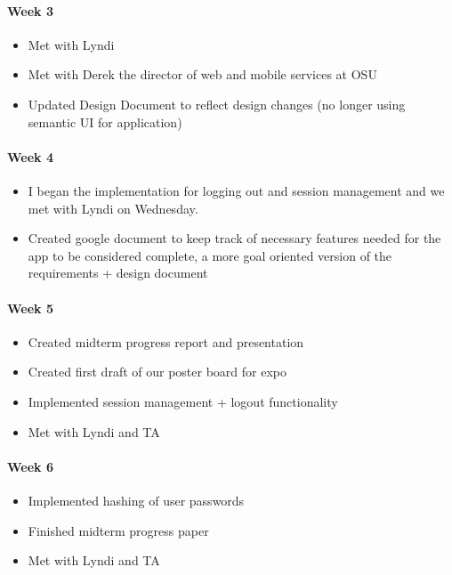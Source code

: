 \documentclass[onecolumn, draftclsnofoot,10pt, compsoc]{IEEEtran}
\begin{document}
      \paragraph{Week 3}
        \begin{itemize}
          \item Met with Lyndi
          \item Met with Derek the director of web and mobile services at OSU
          \item Updated Design Document to reflect design changes (no longer using semantic UI for application)
        \end{itemize}

      \paragraph{Week 4}
        \begin{itemize}
          \item I began the implementation for logging out and session management and we met with Lyndi on Wednesday.
          \item Created google document to keep track of necessary features needed for the app to be considered complete, a more goal oriented version of the requirements + design document
        \end{itemize}

      \paragraph{Week 5}
        \begin{itemize}
          \item Created midterm progress report and presentation
          \item Created first draft of our poster board for expo
          \item Implemented session management + logout functionality
          \item Met with Lyndi and TA
        \end{itemize}

      \paragraph{Week 6}
        \begin{itemize}
          \item Implemented hashing of user passwords
          \item Finished midterm progress paper
          \item Met with Lyndi and TA
        \end{itemize}
\end{document}
